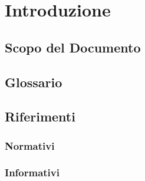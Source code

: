 \section{Introduzione}
\subsection{Scopo del Documento}

\subsection{Glossario}

\subsection{Riferimenti}

\subsubsection{Normativi}

\subsubsection{Informativi}

